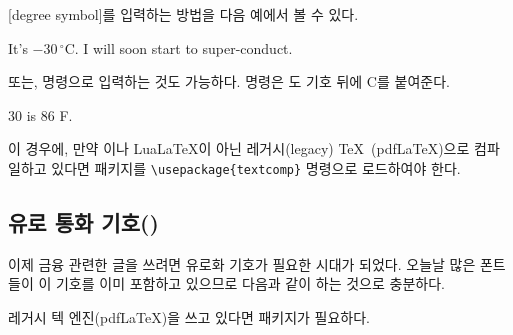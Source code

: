 [degree symbol]를 입력하는 방법을 다음 예에서 볼 수 있다.

\begin{example}
It's $-30\,^{\circ}\mathrm{C}$.
I will soon start to
super-conduct.
\end{example}

또는,  명령으로 입력하는 것도 가능하다.  명령은 도 기호 뒤에 C를 붙여준다.

\begin{example}
30 \textcelsius{} is
86 \textdegree{}F.
\end{example}
\noindent 이 경우에, 만약 \XeLaTeX 이나 Lua\LaTeX 이 아닌 레거시(legacy) \TeX~(pdf\LaTeX)으로 컴파일하고 있다면 
패키지를 \verb|\usepackage{textcomp}| 명령으로 로드하여야 한다.

\subsection{유로 통화 기호(\texorpdfstring{{\texteuro}}{})}

이제 금융 관련한 글을 쓰려면 유로화 기호가 필요한 시대가 되었다.
오늘날 많은 폰트들이 이 기호를 이미 포함하고 있으므로 다음과 같이 하는 것으로 충분하다.
\begin{example}
  \texteuro
\end{example}
\noindent 레거시 텍 엔진(pdf\LaTeX)을 쓰고 있다면  패키지가 필요하다.

